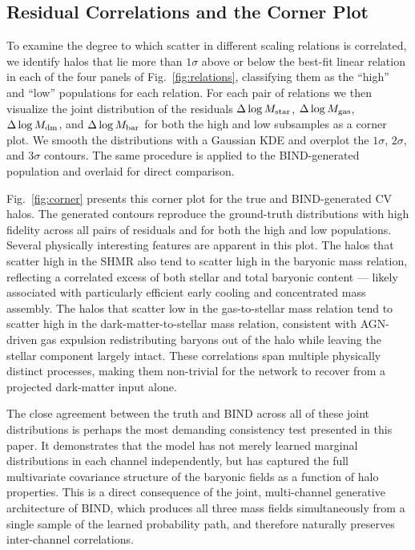 \documentclass[linenumbers,trackchanges, twocolumn]{aastex701}
\begin{document}
\subsection{Residual Correlations and the Corner Plot}
\label{subsec:corner}

To examine the degree to which scatter in different scaling relations is correlated, we identify halos that lie more than $1\sigma$ above or below the best-fit linear relation in each of the four panels of Fig.~\ref{fig:relations}, classifying them as the ``high'' and ``low'' populations for each relation. For each pair of relations we then visualize the joint distribution of the residuals $\Delta\log M_{\rm star}$, $\Delta\log M_{\rm gas}$, $\Delta\log M_{\rm dm}$, and $\Delta\log M_{\rm bar}$ for both the high and low subsamples as a corner plot. We smooth the distributions with a Gaussian KDE and overplot the $1\sigma$, $2\sigma$, and $3\sigma$ contours. The same procedure is applied to the \textsc{BIND}-generated population and overlaid for direct comparison.

Fig.~\ref{fig:corner} presents this corner plot for the true and \textsc{BIND}-generated CV halos. The generated contours reproduce the ground-truth distributions with high fidelity across all pairs of residuals and for both the high and low populations. Several physically interesting features are apparent in this plot. The halos that scatter high in the SHMR also tend to scatter high in the baryonic mass relation, reflecting a correlated excess of both stellar and total baryonic content --- likely associated with particularly efficient early cooling and concentrated mass assembly. The halos that scatter low in the gas-to-stellar mass relation tend to scatter high in the dark-matter-to-stellar mass relation, consistent with AGN-driven gas expulsion redistributing baryons out of the halo while leaving the stellar component largely intact. These correlations span multiple physically distinct processes, making them non-trivial for the network to recover from a projected dark-matter input alone.

The close agreement between the truth and \textsc{BIND} across all of these joint distributions is perhaps the most demanding consistency test presented in this paper. It demonstrates that the model has not merely learned marginal distributions in each channel independently, but has captured the full multivariate covariance structure of the baryonic fields as a function of halo properties. This is a direct consequence of the joint, multi-channel generative architecture of \textsc{BIND}, which produces all three mass fields simultaneously from a single sample of the learned probability path, and therefore naturally preserves inter-channel correlations.
\end{document}
